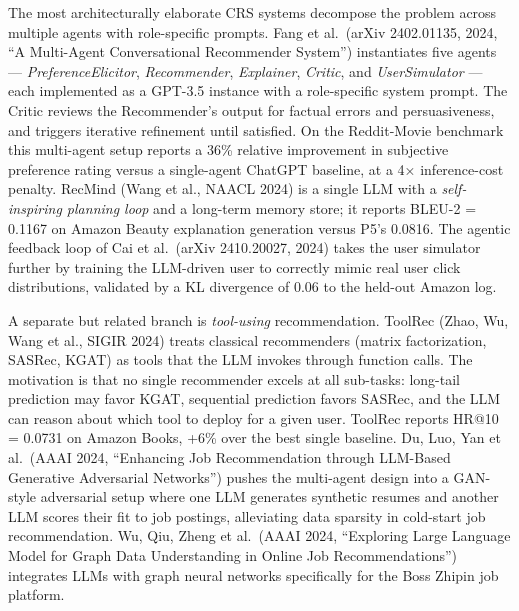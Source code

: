 The most architecturally elaborate CRS systems decompose the problem across multiple agents with role-specific prompts. Fang et al.~(arXiv 2402.01135, 2024, ``A Multi-Agent Conversational Recommender System'') instantiates five agents --- \emph{PreferenceElicitor}, \emph{Recommender}, \emph{Explainer}, \emph{Critic}, and \emph{UserSimulator} --- each implemented as a GPT-3.5 instance with a role-specific system prompt. The Critic reviews the Recommender's output for factual errors and persuasiveness, and triggers iterative refinement until satisfied. On the Reddit-Movie benchmark this multi-agent setup reports a 36\% relative improvement in subjective preference rating versus a single-agent ChatGPT baseline, at a 4× inference-cost penalty. RecMind (Wang et al., NAACL 2024) is a single LLM with a \emph{self-inspiring planning loop} and a long-term memory store; it reports BLEU-2 = 0.1167 on Amazon Beauty explanation generation versus P5's 0.0816. The agentic feedback loop of Cai et al.~(arXiv 2410.20027, 2024) takes the user simulator further by training the LLM-driven user to correctly mimic real user click distributions, validated by a KL divergence of 0.06 to the held-out Amazon log.

A separate but related branch is \emph{tool-using} recommendation. ToolRec (Zhao, Wu, Wang et al., SIGIR 2024) treats classical recommenders (matrix factorization, SASRec, KGAT) as tools that the LLM invokes through function calls. The motivation is that no single recommender excels at all sub-tasks: long-tail prediction may favor KGAT, sequential prediction favors SASRec, and the LLM can reason about which tool to deploy for a given user. ToolRec reports HR@10 = 0.0731 on Amazon Books, +6\% over the best single baseline. Du, Luo, Yan et al.~(AAAI 2024, ``Enhancing Job Recommendation through LLM-Based Generative Adversarial Networks'') pushes the multi-agent design into a GAN-style adversarial setup where one LLM generates synthetic resumes and another LLM scores their fit to job postings, alleviating data sparsity in cold-start job recommendation. Wu, Qiu, Zheng et al.~(AAAI 2024, ``Exploring Large Language Model for Graph Data Understanding in Online Job Recommendations'') integrates LLMs with graph neural networks specifically for the Boss Zhipin job platform.

